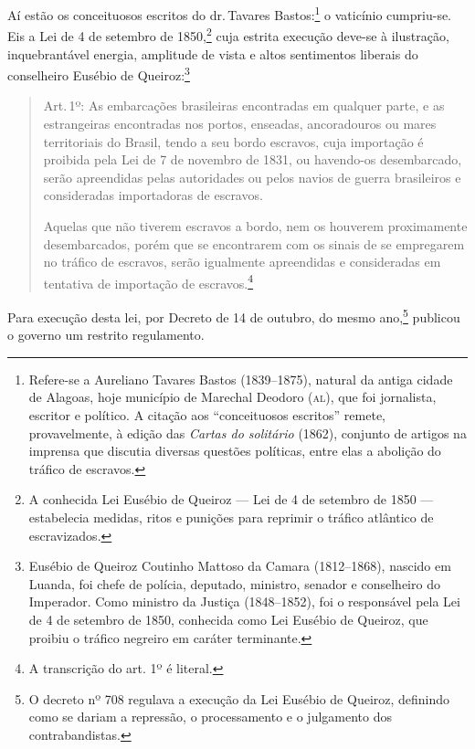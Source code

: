 Aí estão os conceituosos escritos do dr.\,Tavares Bastos:\footnote{
  Refere-se a Aureliano Tavares Bastos (1839--1875), natural da antiga
  cidade de Alagoas, hoje município de Marechal Deodoro (\textsc{al}), que foi
  jornalista, escritor e político. A citação aos ``conceituosos escritos''
  remete, provavelmente, à edição das \emph{Cartas do solitário} (1862),
  conjunto de artigos na imprensa que discutia diversas questões
  políticas, entre elas a abolição do tráfico de escravos.} o vaticínio
cumpriu-se. Eis a Lei de 4 de setembro de 1850,\footnote{A conhecida
  Lei Eusébio de Queiroz --- Lei de 4 de setembro de 1850 --- estabelecia
  medidas, ritos e punições para reprimir o tráfico atlântico de
  escravizados.} cuja estrita execução deve-se à ilustração,
inquebrantável energia, amplitude de vista e altos sentimentos liberais
do conselheiro Eusébio de Queiroz:\footnote{Eusébio de Queiroz \label{eusebio}
  Coutinho Mattoso da Camara (1812--1868), nascido em
  Luanda, foi chefe de polícia, deputado, ministro, senador e
  conselheiro do Imperador. Como ministro da Justiça (1848--1852), foi o
  responsável pela Lei de 4 de setembro de 1850, conhecida como Lei
  Eusébio de Queiroz, que proibiu o tráfico negreiro em caráter
  terminante.}

\begin{quote}
Art.\,1º: As embarcações brasileiras encontradas em qualquer parte, e as
estrangeiras encontradas nos portos, enseadas, ancoradouros ou mares
territoriais do Brasil, tendo a seu bordo escravos, cuja importação é
proibida pela Lei de 7 de novembro de 1831, ou havendo-os desembarcado,
serão apreendidas pelas autoridades ou pelos navios de guerra
brasileiros e consideradas importadoras de escravos.

Aquelas que não tiverem escravos a bordo, nem os houverem proximamente
desembarcados, porém que se encontrarem com os sinais de se empregarem
no tráfico de escravos, serão igualmente apreendidas e consideradas em
tentativa de importação de escravos.\footnote{A transcrição do art.
  1º é literal.}
\end{quote}  

Para execução desta lei, por Decreto de 14 de outubro, do mesmo
ano,\footnote{O decreto nº 708 regulava a execução da Lei Eusébio de
  Queiroz, definindo como se dariam a repressão, o processamento e o
  julgamento dos contrabandistas.} publicou o governo um restrito
regulamento.

\asterisc

